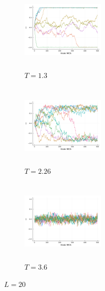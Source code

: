 \documentclass[12pt]{article}
\begin{document}
\begin{figure}[H]
  \centering

  \begin{subfigure}[b]{0.3\linewidth}
    \centering
    \includegraphics[width=150px, height=150px]{../data/magnetizations/20_T1.3.png}
    \caption{$T=1.3$}
    \label{fig:image1}
  \end{subfigure}
  \hfill
  \begin{subfigure}[b]{0.3\linewidth}
    \centering
    \includegraphics[width=150px, height=150px]{../data/magnetizations/20_T2.26.png}
    \caption{$T=2.26$}
    \label{fig:image2}
  \end{subfigure}
  \hfill
  \begin{subfigure}[b]{0.3\linewidth}
    \centering
    \includegraphics[width=150px, height=150px]{../data/magnetizations/20_T3.6.png}
    \caption{$T=3.6$}
    \label{fig:image3}
  \end{subfigure}

  \caption{$L=20$}
  \label{fig:series}
\end{figure}
\end{document}

